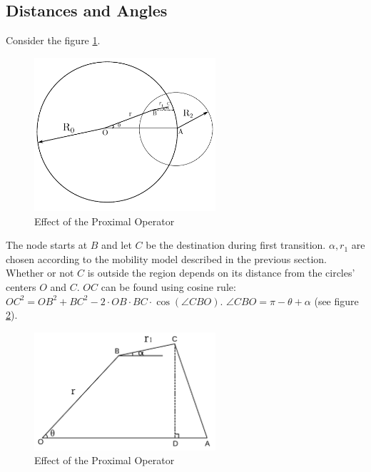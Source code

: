 \subsection{Distances and Angles}
Consider the figure \ref{fig:rr1}. 
\begin{figure}[h]
    \centering \vspace{-0.1in}
    \includegraphics[width=0.6\textwidth]{images/geo1.pdf}
    \vspace{-20pt} \caption[Effect of the proximal Operator]{\small Effect of the Proximal Operator }
    \label{fig:rr1}
\end{figure}
The node starts at $B$ and let $C$ be 
the destination during first transition. $\alpha, r_1$ are chosen according to the mobility 
model described in the previous section. Whether or not $C$ is outside the region depends on
its distance from the circles' centers $O$ and $C$. $OC$ can be found using cosine rule:
$OC^2 = OB^2 + BC^2 - 2 \cdot OB \cdot BC \cdot \cos(\angle CBO)$. $\angle CBO = \pi-\theta+\alpha$ (see figure \ref{fig:ocac}).
\begin{figure}[h]
    \centering \vspace{-0.1in}
    \includegraphics[width=0.6\textwidth]{images/geo2.pdf}
    \vspace{-20pt} \caption[Effect of the proximal Operator]{\small Effect of the Proximal Operator }
    \label{fig:ocac}
\end{figure}

